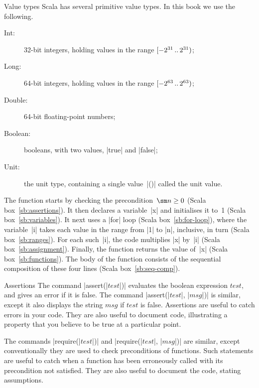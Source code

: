 
\begin{scalaBox}{Value types}
\label{sb:types}
Scala has several primitive value types.  In this book we use the following.
\begin{description}
\item[{\scalashape Int}:] 32-bit integers, holding values in the range
  $[-2^{31} \,..\, 2^{31})$; 

\item[{\scalashape Long}:] 64-bit integers, holding values in the range
  $[-2^{63} \,..\, 2^{63})$; 

\item[{\scalashape Double}:] 64-bit floating-point numbers;

\item[{\scalashape Boolean}:] booleans, with two values, |true| and |false|;

\item[{\scalashape Unit}:] the unit type, containing a single value~|()|
  called the unit value.
\end{description}
\end{scalaBox}



The function starts by checking the precondition~$\sm n \ge 0$ (Scala
box~\ref{sb:assertions}).  It then declares a variable~|x| and initialises it
to~1 (Scala box~\ref{sb:variables}).  It next uses a |for| loop (Scala
box~\ref{sb:for-loop}), where the variable~|i| takes each value in the range
from |1| to |n|, inclusive, in turn (Scala box~\ref{sb:ranges}).  For each
such~|i|, the code multiplies |x| by~|i| (Scala box~\ref{sb:assignment}).
Finally, the function returns the value of~|x| (Scala
box~\ref{sb:functions}). The body of the function consists of the sequential
composition of these four lines (Scala box~\ref{sb:seq-comp}).


\begin{scalaBox}{Assertions}
\label{sb:assertions}
The command |assert(|$test$|)| evaluates the boolean expression $test$, and
gives an error if it is false.  The command |assert(|$test$|, |$msg$|)| is
similar, except it also displays the string $msg$ if $test$ is false.
Assertions are useful to catch errors in your code.  They are also useful to
document code, illustrating a property that you believe to be true at a
particular point.

The commands |require(|$test$|)| and |require(|$test$|, |$msg$|)| are
similar, except conventionally they are used to check preconditions of
functions.  Such statements are useful to catch when a function has been
erroneously called with its precondition not satisfied.  They are also useful
to document the code, stating assumptions.
\end{scalaBox}



